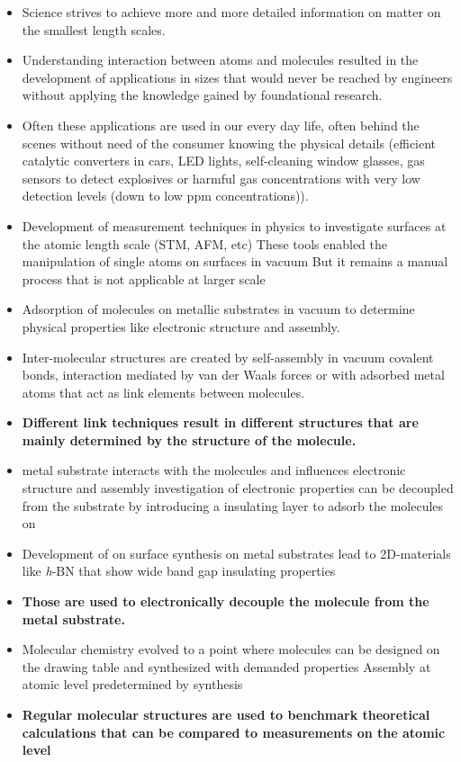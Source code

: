 \begin{itemize}
	\item Science strives to achieve more and more detailed information on matter on the smallest length scales.
	\item Understanding interaction between atoms and molecules resulted in the development of applications in sizes that would never be reached by engineers without applying the knowledge gained by foundational research.
	\item Often these applications are used in our every day life, often behind the scenes without need of the consumer knowing the physical details (efficient catalytic converters in cars, LED lights, self-cleaning window glasses, gas sensors to detect explosives or harmful gas concentrations with very low detection levels (down to low ppm concentrations)).
\end{itemize}
\begin{itemize}
	\item Development of measurement techniques in physics to investigate surfaces at the atomic length scale (STM, AFM, etc)
    \subitem These tools enabled the manipulation of single atoms on surfaces in vacuum \cite{Fe-correl}
    \subitem But it remains a manual process that is not applicable at larger scale
	\item Adsorption of molecules on metallic substrates in vacuum to determine physical properties like electronic structure and assembly.
	\item Inter-molecular structures are created by self-assembly in vacuum
covalent bonds, interaction mediated by van der Waals forces or with adsorbed metal atoms that act as link elements between molecules.
	\item \textbf{Different link techniques result in different structures that are mainly determined by the structure of the molecule.}
	\item metal substrate interacts with the molecules and influences electronic structure and assembly
	\subitem investigation of electronic properties can be decoupled from the substrate by introducing a insulating layer to adsorb the molecules on
\end{itemize}

\begin{itemize}
	\item Development of on surface synthesis on metal substrates lead to 2D-materials like \textit{h}-BN that show wide band gap insulating properties
	\item \textbf{Those are used to electronically decouple the molecule from the metal substrate.}
\end{itemize}

\begin{itemize}
	\item Molecular chemistry evolved to a point where molecules can be designed on the drawing table and synthesized with demanded properties
	\subitem Assembly at atomic level predetermined by synthesis
	\item \textbf{Regular molecular structures are used to benchmark theoretical calculations that can be compared to measurements on the atomic level}
\end{itemize}